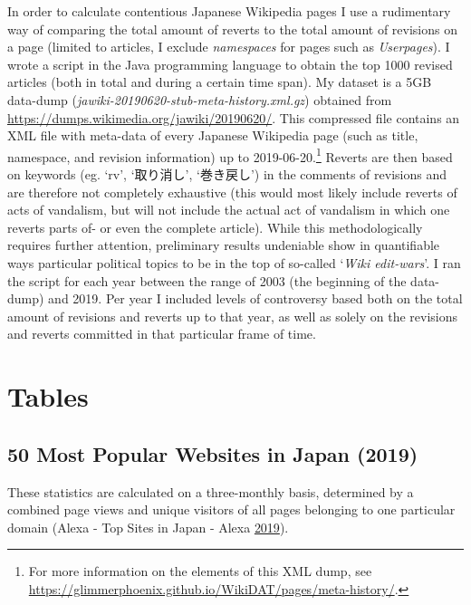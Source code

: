 \documentclass[10pt,british,A4paper,,openany]{memoir}
\begin{document}
In order to calculate contentious Japanese Wikipedia pages I use a
rudimentary way of comparing the total amount of reverts to the total
amount of revisions on a page (limited to articles, I exclude
\emph{namespaces} for pages such as \emph{Userpages}). I wrote a script
in the Java programming language to obtain the top 1000 revised articles
(both in total and during a certain time span). My dataset is a 5GB
data-dump (\emph{jawiki-20190620-stub-meta-history.xml.gz}) obtained
from \url{https://dumps.wikimedia.org/jawiki/20190620/}. This compressed
file contains an XML file with meta-data of every Japanese Wikipedia
page (such as title, namespace, and revision information) up to
2019-06-20.\footnote{For more information on the elements of this XML
  dump, see
  \url{https://glimmerphoenix.github.io/WikiDAT/pages/meta-history/}.}
Reverts are then based on keywords (eg. `rv', `取り消し', `巻き戻し') in
the comments of revisions and are therefore not completely exhaustive
(this would most likely include reverts of acts of vandalism, but will
not include the actual act of vandalism in which one reverts parts of-
or even the complete article). While this methodologically requires
further attention, preliminary results undeniable show in quantifiable
ways particular political topics to be in the top of so-called
`\emph{Wiki edit-wars}'. I ran the script for each year between the
range of 2003 (the beginning of the data-dump) and 2019. Per year I
included levels of controversy based both on the total amount of
revisions and reverts up to that year, as well as solely on the
revisions and reverts committed in that particular frame of time.

\section{Tables}\label{tables}

\subsection{50 Most Popular Websites in Japan
(2019)}\label{most-popular-websites-in-japan-2019}

These statistics are calculated on a three-monthly basis, determined by
a combined page views and unique visitors of all pages belonging to one
particular domain (Alexa - Top Sites in Japan - Alexa
\protect\hyperlink{ref-noauthor_alexa_2019}{2019}).
\end{document}
